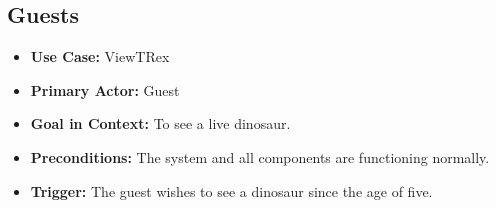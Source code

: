 \documentclass[12pt]{article}
\begin{document}
\subsection{Guests}
\small
    \begin{itemize}
        \item[]\textbf{Use Case:}                                
            ViewTRex

        \item[]\textbf{Primary Actor:}
            Guest

        \item[]\textbf{Goal in Context:}
            To see a live dinosaur.

        \item[]\textbf{Preconditions:}
            The system and all components are functioning normally.
            
        \item[]\textbf{Trigger:}
            The guest wishes to see a dinosaur since the age of five.


\end{itemize}
\end{document}
